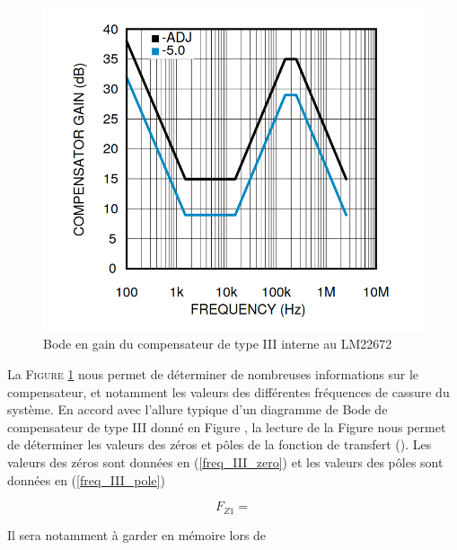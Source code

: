 					\begin{figure}[h]
						\begin{center}
							\includegraphics[scale=0.4]{../Illus/comp_gain.png}
						\end{center}
						\vspace{-2em}
						\caption{Bode en gain du compensateur de type III interne au LM22672 \cite{LM22672}}
						\label{comp_gain}
					\end{figure}
					
					La \textsc{Figure \ref{comp_gain}} nous permet de déterminer de nombreuses informations sur le compensateur, et notamment les valeurs des différentes fréquences de cassure du système. En accord avec l'allure typique d'un diagramme de Bode de compensateur de type III donné en Figure , la lecture de la Figure nous permet de déterminer les valeurs des zéros et pôles de la fonction de transfert (). Les valeurs des zéros sont données en (\ref{freq_III_zero}) et les valeurs des pôles sont données en (\ref{freq_III_pole})
					
					\begin{equation}
						F_{Z1} = 
						\label{freq_III_zero}
					\end{equation}
					
					
					
					Il sera notamment à garder en mémoire lors de 
					
